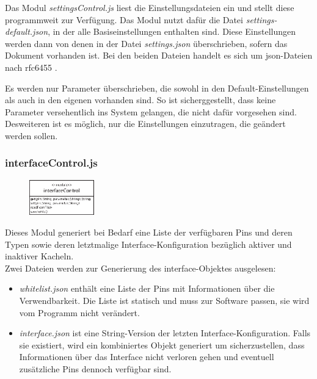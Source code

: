 Das Modul \textit{settingsControl.js} liest die Einstellungsdateien ein und stellt diese programmweit zur Verfügung. Das Modul nutzt dafür die Datei \textit{settings-default.json}, in der alle Basiseinstellungen enthalten sind. Diese Einstellungen werden dann von denen in der Datei \textit{settings.json} überschrieben, sofern das Dokument vorhanden ist. Bei den beiden Dateien handelt es sich um \gls{json}-Dateien nach rfc6455 \cite{rfc6455}.

Es werden nur Parameter überschrieben, die sowohl in den Default-Einstellungen als auch in den eigenen vorhanden sind. So ist sicherggestellt, dass keine Parameter versehentlich ins System gelangen, die nicht dafür vorgesehen sind. Desweiteren ist es möglich, nur die Einstellungen einzutragen, die geändert werden sollen.

\subsubsection{interfaceControl.js}
\begin{figure}
\vspace{-14pt}
\centering
\includegraphics[width = 0.25\textwidth]{documentation/images/apiInterfaceControl.eps}
\end{figure}

Dieses Modul generiert bei Bedarf eine Liste der verfügbaren Pins und deren Typen sowie deren letztmalige Interface-Konfiguration bezüglich aktiver und inaktiver Kacheln.\\

\noindent Zwei Dateien werden zur Generierung des interface-Objektes ausgelesen:

\begin{itemize}
  \item \textit{whitelist.json} enthält eine Liste der Pins mit Informationen über die Verwendbarkeit. Die Liste ist statisch und muss zur Software passen, sie wird vom Programm nicht verändert.
  \item \textit{interface.json} ist eine String-Version der letzten Interface-Konfiguration. Falls sie existiert, wird ein kombiniertes Objekt generiert um sicherzustellen, dass Informationen über das Interface nicht verloren gehen und eventuell zusätzliche Pins dennoch verfügbar sind.
\end{itemize}

